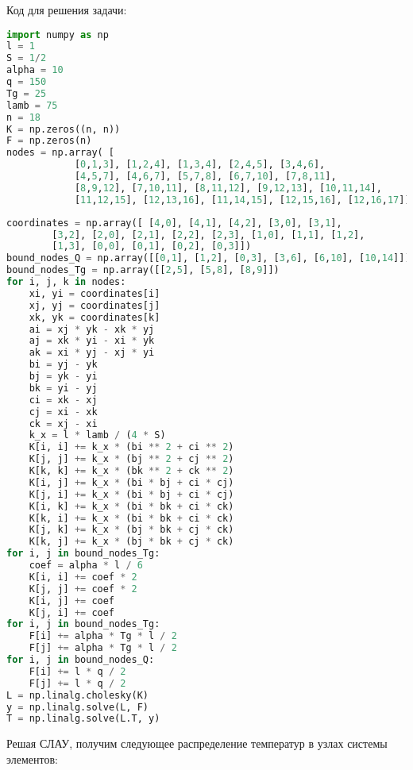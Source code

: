 \documentclass[a4paper, 12pt]{article}
\begin{document}
\begin{enumerate}
Код для решения задачи:
\begin{lstlisting}[language=Python]
import numpy as np
l = 1
S = 1/2
alpha = 10
q = 150
Tg = 25
lamb = 75
n = 18
K = np.zeros((n, n))
F = np.zeros(n)
nodes = np.array( [
            [0,1,3], [1,2,4], [1,3,4], [2,4,5], [3,4,6], 
            [4,5,7], [4,6,7], [5,7,8], [6,7,10], [7,8,11], 
            [8,9,12], [7,10,11], [8,11,12], [9,12,13], [10,11,14], 
            [11,12,15], [12,13,16], [11,14,15], [12,15,16], [12,16,17]])
            \end{lstlisting}
            \newpage
            \begin{lstlisting}[language=Python]
coordinates = np.array([ [4,0], [4,1], [4,2], [3,0], [3,1], 
	    [3,2], [2,0], [2,1], [2,2], [2,3], [1,0], [1,1], [1,2],
	    [1,3], [0,0], [0,1], [0,2], [0,3]])
bound_nodes_Q = np.array([[0,1], [1,2], [0,3], [3,6], [6,10], [10,14]])
bound_nodes_Tg = np.array([[2,5], [5,8], [8,9]])
for i, j, k in nodes:
    xi, yi = coordinates[i]
    xj, yj = coordinates[j]
    xk, yk = coordinates[k]
    ai = xj * yk - xk * yj
    aj = xk * yi - xi * yk
    ak = xi * yj - xj * yi
    bi = yj - yk
    bj = yk - yi
    bk = yi - yj
    ci = xk - xj
    cj = xi - xk
    ck = xj - xi
    k_x = l * lamb / (4 * S)
    K[i, i] += k_x * (bi ** 2 + ci ** 2)
    K[j, j] += k_x * (bj ** 2 + cj ** 2)
    K[k, k] += k_x * (bk ** 2 + ck ** 2)
    K[i, j] += k_x * (bi * bj + ci * cj)
    K[j, i] += k_x * (bi * bj + ci * cj)
    K[i, k] += k_x * (bi * bk + ci * ck)
    K[k, i] += k_x * (bi * bk + ci * ck)
    K[j, k] += k_x * (bj * bk + cj * ck)
    K[k, j] += k_x * (bj * bk + cj * ck)
for i, j in bound_nodes_Tg: 
    coef = alpha * l / 6
    K[i, i] += coef * 2
    K[j, j] += coef * 2
    K[i, j] += coef
    K[j, i] += coef
for i, j in bound_nodes_Tg: 
    F[i] += alpha * Tg * l / 2
    F[j] += alpha * Tg * l / 2
for i, j in bound_nodes_Q: 
    F[i] += l * q / 2
    F[j] += l * q / 2
L = np.linalg.cholesky(K)
y = np.linalg.solve(L, F)
T = np.linalg.solve(L.T, y)
\end{lstlisting}

\newpage
Решая СЛАУ, получим следующее распределение температур в узлах системы элементов:


\end{enumerate}
\end{document}
